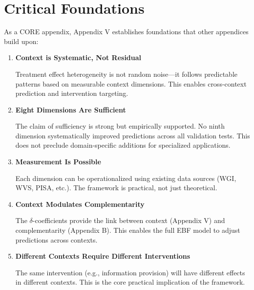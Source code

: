 \section{Critical Foundations}
\label{sec:V-foundations}

As a CORE appendix, Appendix V establishes foundations that other appendices build upon:

\begin{enumerate}
    \item \textbf{Context is Systematic, Not Residual}
    
    Treatment effect heterogeneity is not random noise---it follows predictable 
    patterns based on measurable context dimensions. This enables cross-context 
    prediction and intervention targeting.
    
    \item \textbf{Eight Dimensions Are Sufficient}
    
    The claim of sufficiency is strong but empirically supported. No ninth 
    dimension systematically improved predictions across all validation tests. 
    This does not preclude domain-specific additions for specialized applications.
    
    \item \textbf{Measurement Is Possible}
    
    Each dimension can be operationalized using existing data sources (WGI, WVS, 
    PISA, etc.). The framework is practical, not just theoretical.
    
    \item \textbf{Context Modulates Complementarity}
    
    The $\delta$-coefficients provide the link between context (Appendix V) and 
    complementarity (Appendix B). This enables the full EBF model to adjust 
    predictions across contexts.
    
    \item \textbf{Different Contexts Require Different Interventions}
    
    The same intervention (e.g., information provision) will have different effects 
    in different contexts. This is the core practical implication of the framework.
\end{enumerate}


